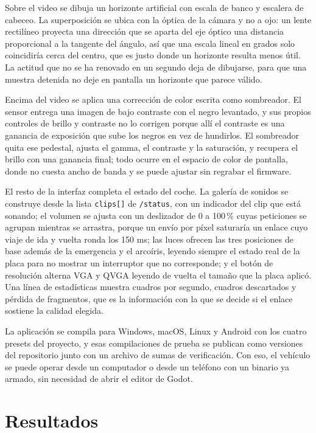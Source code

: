 \documentclass[journal]{IEEEtran}
\begin{document}
Sobre el video se dibuja un horizonte artificial con escala de banco y escalera de cabeceo. La superposición se ubica con la óptica de la cámara y no a ojo: un lente rectilíneo proyecta una dirección que se aparta del eje óptico una distancia proporcional a la tangente del ángulo, así que una escala lineal en grados solo coincidiría cerca del centro, que es justo donde un horizonte resulta menos útil. La actitud que no se ha renovado en un segundo deja de dibujarse, para que una muestra detenida no deje en pantalla un horizonte que parece válido.

Encima del video se aplica una corrección de color escrita como sombreador. El sensor entrega una imagen de bajo contraste con el negro levantado, y sus propios controles de brillo y contraste no lo corrigen porque allí el contraste es una ganancia de exposición que sube los negros en vez de hundirlos. El sombreador quita ese pedestal, ajusta el gamma, el contraste y la saturación, y recupera el brillo con una ganancia final; todo ocurre en el espacio de color de pantalla, donde no cuesta ancho de banda y se puede ajustar sin regrabar el firmware.

El resto de la interfaz completa el estado del coche. La galería de sonidos se construye desde la lista \texttt{clips[]} de \texttt{/status}, con un indicador del clip que está sonando; el volumen se ajusta con un deslizador de 0 a 100\,\% cuyas peticiones se agrupan mientras se arrastra, porque un envío por píxel saturaría un enlace cuyo viaje de ida y vuelta ronda los 150 ms; las luces ofrecen las tres posiciones de base además de la emergencia y el arcoíris, leyendo siempre el estado real de la placa para no mostrar un interruptor que no corresponde; y el botón de resolución alterna VGA y QVGA leyendo de vuelta el tamaño que la placa aplicó. Una línea de estadísticas muestra cuadros por segundo, cuadros descartados y pérdida de fragmentos, que es la información con la que se decide si el enlace sostiene la calidad elegida.

La aplicación se compila para Windows, macOS, Linux y Android con los cuatro presets del proyecto, y esas compilaciones de prueba se publican como versiones del repositorio junto con un archivo de sumas de verificación. Con eso, el vehículo se puede operar desde un computador o desde un teléfono con un binario ya armado, sin necesidad de abrir el editor de Godot.

\section{Resultados}
\end{document}

